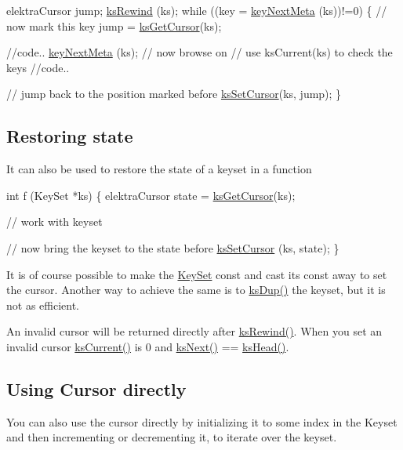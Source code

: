 \begin{DoxyCode}
elektraCursor jump;
\hyperlink{group__keyset_gabe793ff51f1728e3429c84a8a9086b70}{ksRewind} (ks);
\textcolor{keywordflow}{while} ((key = \hyperlink{group__keymeta_ga4c88342f580a4291455a801af71ce048}{keyNextMeta} (ks))!=0)
\{
        \textcolor{comment}{// now mark this key}
        jump = \hyperlink{group__keyset_gace0444eb8ec958a429794f8586fc72e7}{ksGetCursor}(ks);

        \textcolor{comment}{//code..}
        \hyperlink{group__keymeta_ga4c88342f580a4291455a801af71ce048}{keyNextMeta} (ks); \textcolor{comment}{// now browse on}
        \textcolor{comment}{// use ksCurrent(ks) to check the keys}
        \textcolor{comment}{//code..}

        \textcolor{comment}{// jump back to the position marked before}
        \hyperlink{group__keyset_ga28b2a7d13c620b3c9d4815a0608c738f}{ksSetCursor}(ks, jump);
\}
\end{DoxyCode}
\hypertarget{group__keyset_restore}{}\subsection{Restoring state}\label{group__keyset_restore}
It can also be used to restore the state of a keyset in a function


\begin{DoxyCode}
\textcolor{keywordtype}{int} f (KeySet *ks)
\{
        elektraCursor state = \hyperlink{group__keyset_gace0444eb8ec958a429794f8586fc72e7}{ksGetCursor}(ks);

        \textcolor{comment}{// work with keyset}

        \textcolor{comment}{// now bring the keyset to the state before}
        \hyperlink{group__keyset_ga28b2a7d13c620b3c9d4815a0608c738f}{ksSetCursor} (ks, state);
\}
\end{DoxyCode}


It is of course possible to make the \hyperlink{classkdb_1_1KeySet}{Key\+Set} const and cast its const away to set the cursor. Another way to achieve the same is to \hyperlink{group__keyset_gac59e4b328245463f1451f68d5106151c}{ks\+Dup()} the keyset, but it is not as efficient.

An invalid cursor will be returned directly after \hyperlink{group__keyset_gabe793ff51f1728e3429c84a8a9086b70}{ks\+Rewind()}. When you set an invalid cursor \hyperlink{group__keyset_ga4287b9416912c5f2ab9c195cb74fb094}{ks\+Current()} is 0 and \hyperlink{group__keyset_ga317321c9065b5a4b3e33fe1c399bcec9}{ks\+Next()} == \hyperlink{group__keyset_gae7dbf3aef70e67b5328475eb3d1f92f5}{ks\+Head()}.\hypertarget{group__keyset_cursor_directly}{}\subsection{Using Cursor directly}\label{group__keyset_cursor_directly}
You can also use the cursor directly by initializing it to some index in the Keyset and then incrementing or decrementing it, to iterate over the keyset.


